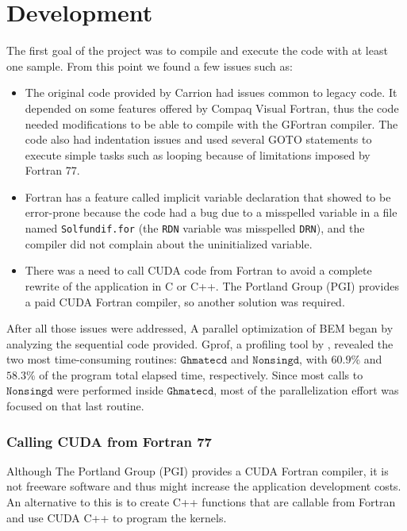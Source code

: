 \chapter{Development}

The first goal of the project was to compile and execute the code with at least one sample. 
From this point we found a few issues such as:

\begin{itemize}
\item The original code provided by Carrion had issues common to legacy code. 
It depended on some features offered by Compaq Visual Fortran, thus the code needed 
modifications to be able to compile with the GFortran compiler. The code also had 
indentation issues and used several GOTO statements to execute simple tasks such 
as looping because of limitations imposed by Fortran 77.

\item Fortran has a feature called implicit variable declaration that showed to be 
error-prone because the code had a bug due to a misspelled variable in a file 
named \texttt{Solfundif.for} (the \texttt{RDN} variable was misspelled \texttt{DRN}),
and the compiler did not complain about the uninitialized variable.

\item There was a need to call CUDA code from Fortran to avoid a complete rewrite of the 
application in C or C++. The Portland Group (PGI) provides a paid CUDA Fortran compiler,
so another solution was required.

\end{itemize}


After all those issues were addressed, A parallel optimization of BEM began by analyzing the sequential code provided. 
Gprof, a profiling tool by \cite{binutils}, revealed the two most time-consuming routines: 
$\texttt{Ghmatecd}$ and $\texttt{Nonsingd}$, with $60.9\%$ and $58.3\%$ of the program total 
elapsed time, respectively.
Since most calls to $\texttt{Nonsingd}$ were performed inside $\texttt{Ghmatecd}$, most
of the parallelization effort was focused 
on that last routine.


\subsection{Calling CUDA from Fortran 77}

Although The Portland Group (PGI) provides a CUDA Fortran compiler, it is not freeware software 
and thus might increase the application development costs. An alternative to this is to 
create C++ functions that are callable from Fortran and use CUDA C++ to program the kernels.

